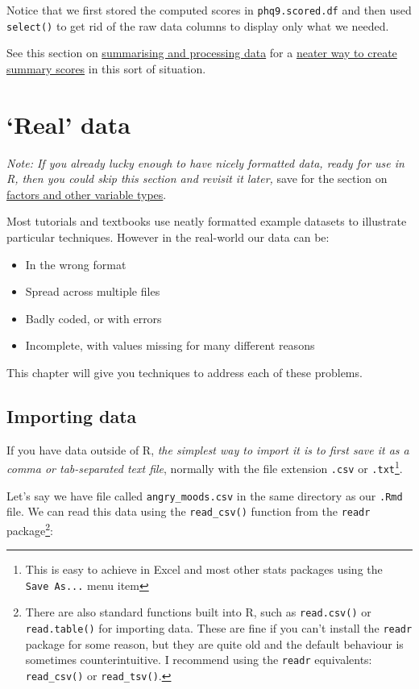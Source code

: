 \documentclass[]{article}
\providecommand{\tightlist}{%
  \setlength{\itemsep}{0pt}\setlength{\parskip}{0pt}}
\let\rmarkdownfootnote\footnote%
\def\footnote{\protect\rmarkdownfootnote}
\theoremstyle{definition}
\theoremstyle{definition}
\theoremstyle{definition}
\theoremstyle{remark}
\begin{document}
Notice that we first stored the computed scores in
\texttt{phq9.scored.df} and then used \texttt{select()} to get rid of
the raw data columns to display only what we needed.

See this section on \protect\hyperlink{split-apply-combine}{summarising
and processing data} for a
\protect\hyperlink{mutate-with-rowmeans}{neater way to create summary
scores} in this sort of situation.

\section{\texorpdfstring{`Real' data}{Real data}}\label{real-data}

\emph{Note: If you already lucky enough to have nicely formatted data,
ready for use in R, then you could skip this section and revisit it
later,} save for the section on
\protect\hyperlink{factors-and-numerics}{factors and other variable
types}.

Most tutorials and textbooks use neatly formatted example datasets to
illustrate particular techniques. However in the real-world our data can
be:

\begin{itemize}
\tightlist
\item
  In the wrong format
\item
  Spread across multiple files
\item
  Badly coded, or with errors
\item
  Incomplete, with values missing for many different reasons
\end{itemize}

This chapter will give you techniques to address each of these problems.

\hypertarget{importing-data}{\subsection*{Importing
data}\label{importing-data}}

If you have data outside of R, \emph{the simplest way to import it is to
first save it as a comma or tab-separated text file}, normally with the
file extension \texttt{.csv} or \texttt{.txt}\footnote{This is easy to
  achieve in Excel and most other stats packages using the
  \texttt{Save\ As...} menu item}.

Let's say we have file called \texttt{angry\_moods.csv} in the same
directory as our \texttt{.Rmd} file. We can read this data using the
\texttt{read\_csv()} function from the \texttt{readr} package\footnote{There
  are also standard functions built into R, such as \texttt{read.csv()}
  or \texttt{read.table()} for importing data. These are fine if you
  can't install the \texttt{readr} package for some reason, but they are
  quite old and the default behaviour is sometimes counterintuitive. I
  recommend using the \texttt{readr} equivalents: \texttt{read\_csv()}
  or \texttt{read\_tsv()}.}:
\end{document}
